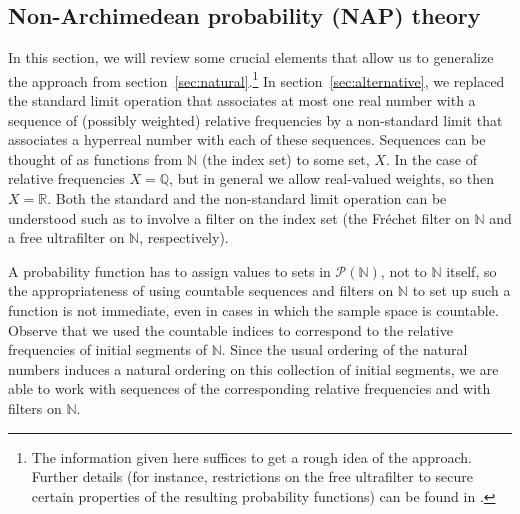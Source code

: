 \subsection{Non-Archimedean probability (NAP) theory}\label{sec:NAP}
In this section, we will review some crucial elements that allow us to generalize the approach from section~\ref{sec:natural}.\footnote{The information given here suffices to get a rough idea of the approach. Further details (for instance, restrictions on the free ultrafilter to secure certain properties of the resulting probability functions) can be found in \citet{Benci_etal:2013}.}
In section~\ref{sec:alternative}, we replaced the standard limit operation that associates at most one real number with a sequence of (possibly weighted) relative frequencies by a non-standard limit that associates a hyperreal number with each of these sequences.
Sequences can be thought of as functions from $\mathbb{N}$ (the index set) to some set, $X$. In the case of relative frequencies $X=\mathbb{Q}$, but in general we allow real-valued weights, so then $X=\mathbb{R}$.
Both the standard and the non-standard limit operation can be understood such as to involve a filter on the index set (the Fr{\'e}chet filter on $\mathbb{N}$ and a free ultrafilter on $\mathbb{N}$, respectively).

A probability function has to assign values to sets in $\mathcal{P}(\mathbb{N})$, not to $\mathbb{N}$ itself, so the appropriateness of using countable sequences and filters on $\mathbb{N}$ to set up such a function is not immediate, even in cases in which the sample space is countable. Observe that we used the countable indices to correspond to the relative frequencies of initial segments of $\mathbb{N}$. Since the usual ordering of the natural numbers induces a natural ordering on this collection of initial segments, we are able to work with sequences of the corresponding relative frequencies and with filters on $\mathbb{N}$.

